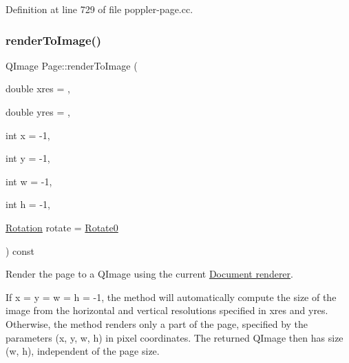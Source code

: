 Definition at line 729 of file poppler-\/page.\+cc.

\mbox{\label{class_poppler_1_1_page_a204d8018439dabf54b3b6f80be843dc3}} 
\subsubsection{\texorpdfstring{render\+To\+Image()}{renderToImage()}}
{\footnotesize\ttfamily Q\+Image Page\+::render\+To\+Image (\begin{DoxyParamCaption}\item[{double}]{xres = {},  }\item[{double}]{yres = {},  }\item[{int}]{x = {\ttfamily -\/1},  }\item[{int}]{y = {\ttfamily -\/1},  }\item[{int}]{w = {\ttfamily -\/1},  }\item[{int}]{h = {\ttfamily -\/1},  }\item[{\hyperlink{class_poppler_1_1_page_a9c9a4e1bc301cd2ab4eac0b51f0dc0ec}{Rotation}}]{rotate = {\ttfamily \hyperlink{class_poppler_1_1_page_a9c9a4e1bc301cd2ab4eac0b51f0dc0eca6bd60f29c8d73b686ceb2030964823db}{Rotate0}} }\end{DoxyParamCaption}) const}

Render the page to a Q\+Image using the current \hyperlink{class_poppler_1_1_document_ae9aefd54aa4b72dc46bea2c114a02cbe}{Document renderer}.

If {\ttfamily x} = {\ttfamily y} = {\ttfamily w} = {\ttfamily h} = -\/1, the method will automatically compute the size of the image from the horizontal and vertical resolutions specified in {\ttfamily xres} and {\ttfamily yres}. Otherwise, the method renders only a part of the page, specified by the parameters ({\ttfamily x}, {\ttfamily y}, {\ttfamily w}, {\ttfamily h}) in pixel coordinates. The returned Q\+Image then has size ({\ttfamily w}, {\ttfamily h}), independent of the page size.


